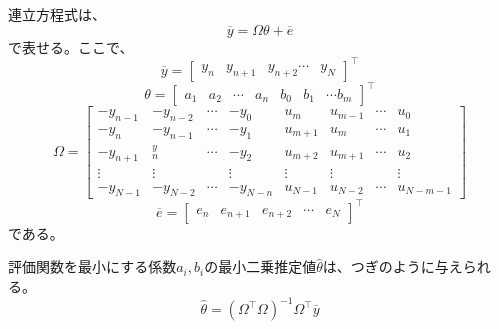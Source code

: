 \documentclass[a4paper,twocolumn]{jarticle}
\begin{document}
連立方程式は、
\[
  \overline{y}=\Omega\theta+\overline{e}
\]
で表せる。ここで、
\[
  \overline{y}=\begin{bmatrix}
    y_n&y_{n+1}&y_{n+2}\cdots&y_N
  \end{bmatrix}^\top
\]
\[
  \theta=\begin{bmatrix}
    a_1&a_2&\cdots&a_n&b_0&b_1&\cdots b_m
  \end{bmatrix}^\top
\]
\[
  \Omega=\begin{bmatrix}
    -y_{n-1}&-y_{n-2}&\cdots&-y_0&u_m&u_{m-1}&\cdots&u_0\\
    -y_n&-y_{n-1}&\cdots&-y_1&u_{m+1}&u_m&\cdots&u_1\\
    -y_{n+1}&^y_n&\cdots&-y_2&u_{m+2}&u_{m+1}&\cdots&u_2\\
    \vdots&\vdots&&\vdots&\vdots&\vdots&&\vdots\\
    -y_{N-1}&-y_{N-2}&\cdots&-y_{N-n}&u_{N-1}&u_{N-2}&\cdots&u_{N-m-1}
  \end{bmatrix}
\]
\[
  \overline{e}=\begin{bmatrix}
    e_n&e_{n+1}&e_{n+2}&\cdots&e_N
  \end{bmatrix}^\top
\]
である。

評価関数を最小にする係数$a_i,b_i$の最小二乗推定値$\hat{\theta}$は、つぎのように与えられる。
\[
  \hat{\theta}=(\Omega^\top\Omega)^{-1}\Omega^\top\overline{y}
\]

\end{document}
